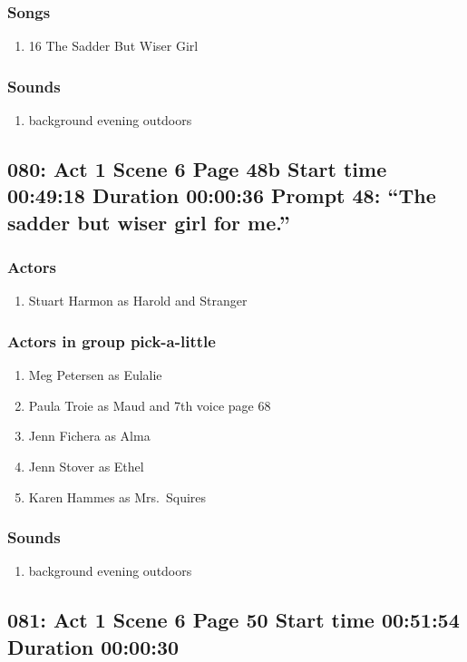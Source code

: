 \subsubsection{Songs}
\begin{enumerate}
\item 16 The Sadder But Wiser Girl
\end{enumerate}\subsubsection{Sounds}
\begin{enumerate}
\item background evening outdoors
\end{enumerate}
\subsection{080: Act 1 Scene 6 Page 48b Start time 00:49:18 Duration 00:00:36 Prompt 48: ``The sadder but wiser girl for me.''}

\subsubsection{Actors}
\begin{enumerate}
\item Stuart Harmon as Harold and Stranger
\end{enumerate}
\subsubsection{Actors in group pick-a-little}
\begin{enumerate}
\item Meg Petersen as Eulalie
\item Paula Troie as Maud and 7th voice page 68
\item Jenn Fichera as Alma
\item Jenn Stover as Ethel
\item Karen Hammes as Mrs.~Squires
\end{enumerate}

\subsubsection{Sounds}
\begin{enumerate}
\item background evening outdoors
\end{enumerate}
\subsection{081: Act 1 Scene 6 Page 50 Start time 00:51:54 Duration 00:00:30}

